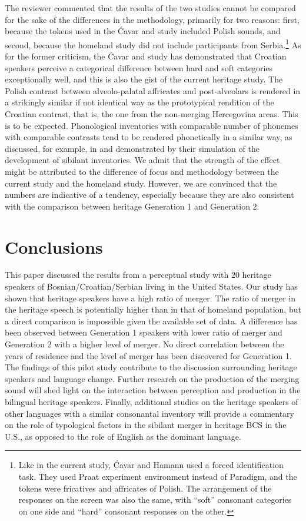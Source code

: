 \documentclass[output=paper,modfonts,nonflat,
]{langsci/langscibook}
\begin{document}
The reviewer commented that the results of the two studies cannot be compared for the sake of the differences in the methodology, primarily for two reasons: first, because the tokens used in the Ćavar and \citet{Hamann2011} study included Polish sounds, and second, because the homeland study did not include participants from Serbia.\footnote{Like in the current study, Ćavar and Hamann used a forced identification task. They used Praat experiment environment instead of Paradigm, and the tokens were fricatives and affricates of Polish. The arrangement of the responses on the screen was also the same, with “soft” consonant categories on one side and “hard” consonant responses on the other.} As for the former criticism, the Ćavar and \citet{Hamann2011} study has demonstrated that Croatian speakers perceive a categorical difference between hard and soft categories exceptionally well, and this is also the gist of the current heritage study. The Polish contrast between alveolo-palatal affricates and post-alveolars is rendered in a strikingly similar if not identical way as the prototypical rendition of the Croatian contrast, that is, the one from the non-merging Hercegovina areas. This is to be expected. Phonological inventories with comparable number of phonemes with comparable contrasts tend to be rendered phonetically in a similar way, as discussed, for example, in \citet{BoersmaHamann2008} and demonstrated by their simulation of the development of sibilant inventories. We admit that the strength of the effect might be attributed to the difference of focus and methodology between the current study and the homeland study. However, we are convinced that the numbers are indicative of a tendency, especially because they are also consistent with the comparison between heritage Generation 1 and Generation 2.


\section{Conclusions}

This paper discussed the results from a perceptual study with 20 heritage speakers of Bosnian/Croatian/Serbian living in the United States. Our study has shown that heritage speakers have a high ratio of merger. The ratio of merger in the heritage speech is potentially higher than in that of homeland population, but a direct comparison is impossible given the available set of data. {A} difference has been observed between Generation 1 speakers with lower ratio of merger and Generation 2 with a higher level of merger. No direct correlation between the years of residence and the level of merger has been discovered for Generation 1. The findings of this pilot study contribute to the discussion surrounding heritage speakers and language change. Further research on the production of the merging sound will shed light on the interaction between perception and production in the bilingual heritage speakers. Finally, additional studies on the heritage speakers of other languages with a similar consonantal inventory will provide a commentary on the role of typological factors in the sibilant merger in heritage BCS in the U.S., as opposed to the role of English as the dominant language.
\end{document}
